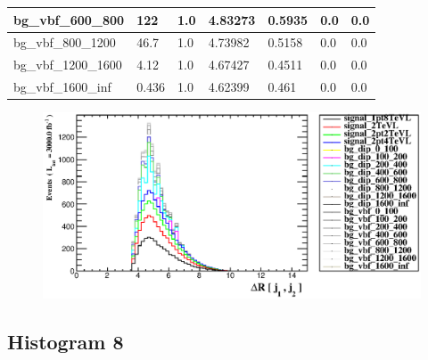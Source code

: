 \documentclass[a4paper, 10pt]{article}
\begin{document}
\begin{table}[H]
\begin{center}
\begin{tabular}{|m{23.0mm}|m{23.0mm}|m{18.0mm}|m{19.0mm}|m{19.0mm}|m{19.0mm}|m{19.0mm}|}
      \hline
      {\cellcolor{white}         bg\_vbf\_600\_800}& {\cellcolor{white}         122}& {\cellcolor{white}         1.0}& {\cellcolor{white}         4.83273}& {\cellcolor{white}         0.5935}& {\cellcolor{green}         0.0}& {\cellcolor{green}         0.0}\\
      \hline
      {\cellcolor{white}         bg\_vbf\_800\_1200}& {\cellcolor{white}         46.7}& {\cellcolor{white}         1.0}& {\cellcolor{white}         4.73982}& {\cellcolor{white}         0.5158}& {\cellcolor{green}         0.0}& {\cellcolor{green}         0.0}\\
      \hline
      {\cellcolor{white}         bg\_vbf\_1200\_1600}& {\cellcolor{white}         4.12}& {\cellcolor{white}         1.0}& {\cellcolor{white}         4.67427}& {\cellcolor{white}         0.4511}& {\cellcolor{green}         0.0}& {\cellcolor{green}         0.0}\\
      \hline
      {\cellcolor{white}         bg\_vbf\_1600\_inf}& {\cellcolor{white}         0.436}& {\cellcolor{white}         1.0}& {\cellcolor{white}         4.62399}& {\cellcolor{white}         0.461}& {\cellcolor{green}         0.0}& {\cellcolor{green}         0.0}\\
\hline
    \end{tabular}
  \end{center}
\end{table}

\begin{figure}[H]
  \begin{center}
    \includegraphics[scale=0.45]{selection_6.eps}\\
\caption{   }
  \end{center}
\end{figure}
      \newpage
\subsection{ Histogram 8}
\end{document}
